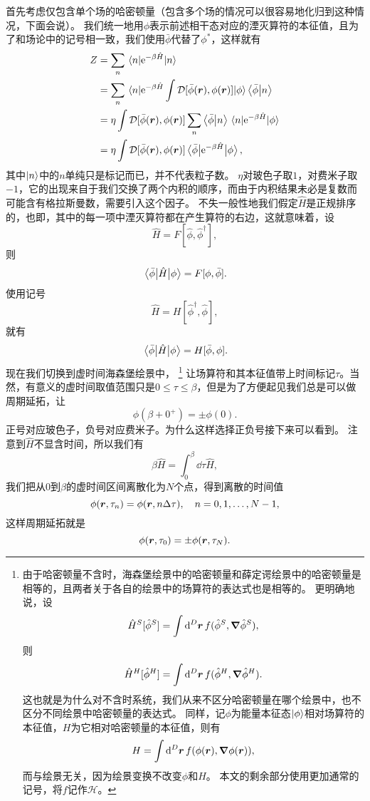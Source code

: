 \documentclass[hyperref, UTF8, a4paper]{ctexart}
\newcommand*{\ee}{\mathrm{e}}
\newcommand*{\fd}[1]{\mathcal{D}{#1}}
\begin{document}
首先考虑仅包含单个场的哈密顿量（包含多个场的情况可以很容易地化归到这种情况，下面会说）。
我们统一地用$\phi$表示前述相干态对应的湮灭算符的本征值，且为了和场论中的记号相一致，我们使用$\bar{\phi}$代替了$\phi^*$，这样就有
\[
    \begin{aligned}
        Z &= \sum_n \mel{n}{\ee^{-\beta \hat{H}}}{n} \\
        &= \sum_n \mel{n}{\ee^{- \beta \hat{H}} \int \fd{[\bar{\phi}(\vb*{r}), \phi(\vb*{r})]} }{\phi} \braket{\bar{\phi}}{n} \\
        &= \eta \int \fd{[\bar{\phi}(\vb*{r}), \phi(\vb*{r})]} \sum_n \braket{\bar{\phi}}{n} \mel{n}{\ee^{- \beta \hat{H}} }{\phi} \\
        &= \eta \int \fd{[\bar{\phi}(\vb*{r}), \phi(\vb*{r})]} \mel{\bar{\phi}}{\ee^{- \beta \hat{H}}}{\phi},
    \end{aligned}
\]
其中$\ket{n}$中的$n$单纯只是标记而已，并不代表粒子数。
$\eta$对玻色子取$1$，对费米子取$-1$，它的出现来自于我们交换了两个内积的顺序，而由于内积结果未必是复数而可能含有格拉斯曼数，需要引入这个因子。
不失一般性地我们假定$\hat{H}$是正规排序的，也即，其中的每一项中湮灭算符都在产生算符的右边，这就意味着，设
\[
    \hat{H} = F [\hat{\phi}, \hat{\phi}^\dagger],
\]
则
\[
    \mel{\bar{\phi}}{\hat{H}}{\phi} = F[\phi, \bar{\phi}].
\]
使用记号
\[
    \hat{H} = H[\hat{\phi}^\dagger, \hat{\phi}],
\]
就有
\[
    \mel{\bar{\phi}}{\hat{H}}{\phi} = H[\bar{\phi}, \phi].
\]
现在我们切换到虚时间海森堡绘景中，%
\footnote{由于哈密顿量不含时，海森堡绘景中的哈密顿量和薛定谔绘景中的哈密顿量是相等的，且两者关于各自的绘景中的场算符的表达式也是相等的。
更明确地说，设
\[
    \hat{H}^S[\hat{\phi}^S] = \int \dd[D]{\vb*{r}} f(\hat{\phi}^S, \grad{\hat{\phi}^S}),
\]
则
\[
    \hat{H}^H[\hat{\phi}^H] = \int \dd[D]{\vb*{r}} f(\hat{\phi}^H, \grad{\hat{\phi}^H}).
\]
这也就是为什么对不含时系统，我们从来不区分哈密顿量在哪个绘景中，也不区分不同绘景中哈密顿量的表达式。
同样，记$\phi$为能量本征态$\ket{\phi}$相对场算符的本征值，$H$为它相对哈密顿量的本征值，则有
\[
    H = \int \dd[D]{\vb*{r}} f(\phi(\vb*{r}), \grad{\phi(\vb*{r})}),
\]
而与绘景无关，因为绘景变换不改变$\phi$和$H$。
本文的剩余部分使用更加通常的记号，将$f$记作$\mathcal{H}$。
}%
让场算符和其本征值带上时间标记$\tau$。当然，有意义的虚时间取值范围只是$0 \leq \tau \leq \beta$，但是为了方便起见我们总是可以做周期延拓，让
\[
    \phi(\beta+0^+) = \pm \phi(0).
\]
正号对应玻色子，负号对应费米子。为什么这样选择正负号接下来可以看到。
注意到$\hat{H}$不显含时间，所以我们有
\[
    \beta \hat{H} = \int_0^\beta \dd{\tau} \hat{H},
\]
我们把从$0$到$\beta$的虚时间区间离散化为$N$个点，得到离散的时间值
\[
    \phi(\vb*{r}, \tau_n) = \phi(\vb*{r}, n \Delta \tau), \quad n = 0, 1, \ldots, N-1,
\]
这样周期延拓就是
\[
    \phi(\vb*{r}, \tau_0) = \pm \phi(\vb*{r}, \tau_N).
\]
\end{document}
